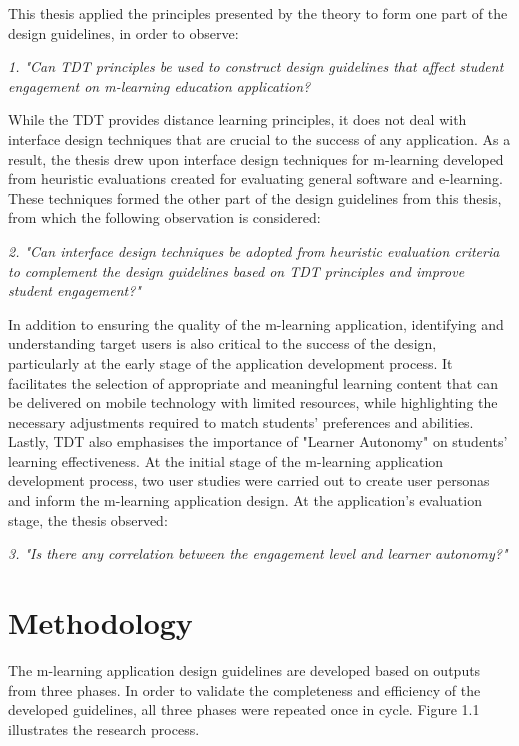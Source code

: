 This thesis applied the principles presented by the theory to form one part of the design guidelines, in order to observe: 

\hfill
\begin{addmargin}[1.5em]{1.5em}
\textit{1. "Can TDT principles be used to construct design guidelines that affect student engagement on m-learning education application?}
\end{addmargin}
\hfill 

While the TDT provides distance learning principles, it does not deal with interface design techniques that are crucial to the success of any application. As a result, the thesis drew upon interface design techniques for m-learning developed from heuristic evaluations created for evaluating general software and e-learning. These techniques formed the other part of the design guidelines from this thesis, from which the following observation is considered: 

\hfill
\begin{addmargin}[1.5em]{1.5em}
\textit{2. "Can interface design techniques be adopted from heuristic evaluation criteria to complement the design guidelines based on TDT principles and improve student engagement?"}
\end{addmargin}
\hfill 

	In addition to ensuring the quality of the m-learning application, identifying and understanding target users is also critical to the success of the design, particularly at the early stage of the application development process. It facilitates the selection of appropriate and meaningful learning content that can be delivered on mobile technology with limited resources, while highlighting the necessary adjustments required to match students' preferences and abilities. Lastly, TDT also emphasises the importance of "Learner Autonomy" on students' learning effectiveness. At the initial stage of the m-learning application development process, two user studies were carried out to create user personas and inform the m-learning application design. At the application's evaluation stage, the thesis observed: 

\hfill
\begin{addmargin}[1.5em]{1.5em}
\textit{3. "Is there any correlation between the engagement level and learner autonomy?"}
\end{addmargin}

\section{Methodology}
The m-learning application design guidelines are developed based on outputs from three phases. In order to validate the completeness and efficiency of the developed guidelines, all three phases were repeated once in cycle. Figure 1.1 illustrates the research process. 

